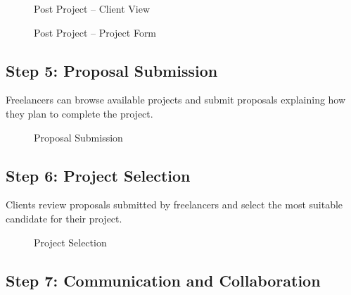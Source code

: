 \documentclass[12pt,a4paper,oneside]{report}
\numberwithin{figure}{chapter}
\numberwithin{table}{chapter}
\begin{document}
\begin{figure}[H]
  \centering
  \caption{Post Project -- Client View}
  \label{fig:post_project1}
\end{figure}

\begin{figure}[H]
  \centering
  \caption{Post Project -- Project Form}
  \label{fig:post_project2}
\end{figure}

\subsection{Step 5: Proposal Submission}

Freelancers can browse available projects and submit proposals explaining how they plan
to complete the project.

\begin{figure}[H]
  \centering
  \caption{Proposal Submission}
  \label{fig:proposal}
\end{figure}

\subsection{Step 6: Project Selection}

Clients review proposals submitted by freelancers and select the most suitable candidate
for their project.

\begin{figure}[H]
  \centering
  \caption{Project Selection}
  \label{fig:selection}
\end{figure}

\subsection{Step 7: Communication and Collaboration}
\end{document}
